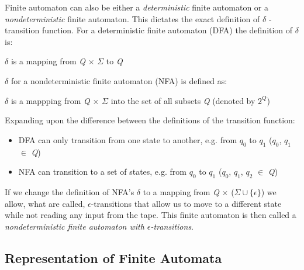 Finite automaton can also be either a \textit{deterministic} finite automaton or a \textit{nondeterministic} finite automaton. This dictates the exact definition of $\delta$ - transition function.
For a deterministic finite automaton (DFA) the definition of $\delta$ is:\\
\centerline{$\delta$ is a mapping from \textit{Q} $\times$ $\Sigma$ to \textit{Q}}
$\delta$ for a nondeterministic finite automaton (NFA) is defined as:\\
\centerline{$\delta$ is a mappping from \textit{Q} $\times$ $\Sigma$ into the set of all subsets \textit{Q} (denoted by $2^\textit{Q}$)}
Expanding upon the difference between the definitions of the transition function:
\begin{itemize}
    \item DFA can only transition from one state to another, e.g. from $\textit{q}_0$ to $\textit{q}_1$ ($\textit{q}_0$, $\textit{q}_1$ $\in$ \textit{Q})
    \item NFA can transition to a set of states, e.g. from $\textit{q}_0$ to $\textit{q}_1$ ($\textit{q}_0$, $\textit{q}_1$, $\textit{q}_2$ $\in$ \textit{Q})
\end{itemize}
If we change the definition of NFA's $\delta$ to a mapping from \textit{Q} $\times$ ($\Sigma \cup \{\epsilon\}$) we allow, what are called, $\epsilon$-transitions that allow us to move to a different state while not reading any input from the tape. This finite automaton is then called a \textit{nondeterministic finite automaton with $\epsilon$-transitions}.

\subsection{Representation of Finite Automata}

